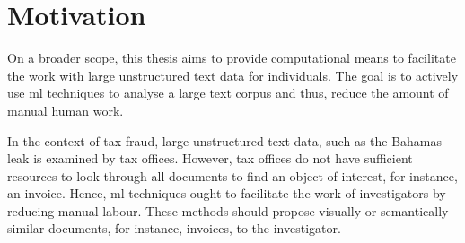 \section{Motivation}\label{sec:motivation}

On a broader scope, this thesis aims to provide computational means to facilitate the work with large unstructured text data for individuals.
The goal is to actively use \ac{ml} techniques to analyse a large text corpus and thus, reduce the amount of manual human work.

In the context of tax fraud, large unstructured text data, such as the Bahamas leak is examined by tax offices.
However, tax offices do not have sufficient resources to look through all documents to find an object of interest, for instance, an invoice.
Hence, \ac{ml} techniques ought to facilitate the work of investigators by reducing manual labour.
These methods should propose visually or semantically similar documents, for instance, invoices, to the investigator.